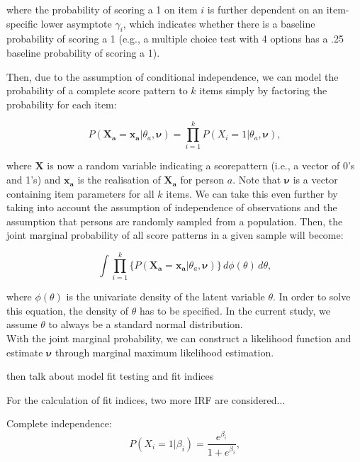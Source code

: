 \documentclass[Royal,sageapa,times,doublespace]{sagej}
\begin{document}
where the probability of scoring a 1 on item $i$ is further dependent on an item-specific lower asymptote $\gamma_i$, which indicates whether there is
a baseline probability of scoring a 1 (e.g., a multiple choice test with 4 options has a .25 baseline probability of scoring a 1).

Then, due to the assumption of conditional independence, we can model the probability of a complete score pattern to $k$ items simply by factoring the probability for each item:

\begin{equation}
P(\boldsymbol{X_a} = \boldsymbol{x_a} | \theta_a, \boldsymbol{\nu}) = \prod_{i=1}^{k} P(X_i = 1 | \theta_a, \boldsymbol{\nu}),
\end{equation}

where $\boldsymbol{X}$ is now a random variable indicating a scorepattern (i.e., a vector of 0's and 1's) and $\boldsymbol{x_a}$ is the realisation of $\boldsymbol{X_a}$ for person $a$. Note that $\boldsymbol{\nu}$ is a vector containing item parameters for all $k$ items. We can take this even further by taking into account the assumption of independence of observations and the assumption that persons are randomly sampled from a population. Then, the joint marginal probability of all score patterns in a given sample will become:

\begin{equation}
\int \prod_{i=1}^{k} \{ P(\boldsymbol{X_a} = \boldsymbol{x_a} | \theta_a, \boldsymbol{\nu}) \} \,d\phi(\theta)\,d\theta,
\end{equation}

where $\phi(\theta)$ is the univariate density of the latent variable $\theta$. In order to solve this equation, the density of $\theta$ has to be specified. In the current study, we assume $\theta$ to always be a standard normal distribution. \\
\indent With the joint marginal probability, we can construct a likelihood function and estimate $\boldsymbol{\nu}$ through marginal maximum likelihood estimation. 

then talk about model fit testing and fit indices

For the calculation of fit indices, two more IRF are considered...

Complete independence:
\begin{equation}
P(X_i = 1 | \beta_{i}) = \frac{e^{\beta_{i}}}{1 + e^{\beta_{i}}},
\end{equation}
\end{document}
